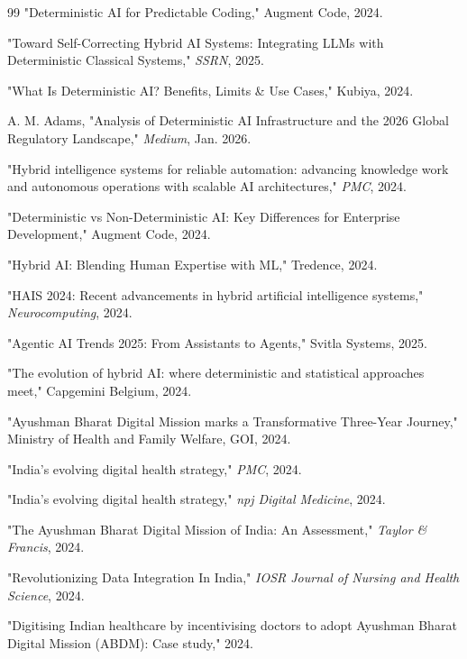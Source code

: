 \documentclass[conference]{IEEEtran}
\begin{document}
\begin{thebibliography}{99}
"Deterministic AI for Predictable Coding," Augment Code, 2024.

"Toward Self-Correcting Hybrid AI Systems: Integrating LLMs with Deterministic Classical Systems," \textit{SSRN}, 2025.

"What Is Deterministic AI? Benefits, Limits \& Use Cases," Kubiya, 2024.

A. M. Adams, "Analysis of Deterministic AI Infrastructure and the 2026 Global Regulatory Landscape," \textit{Medium}, Jan. 2026.

"Hybrid intelligence systems for reliable automation: advancing knowledge work and autonomous operations with scalable AI architectures," \textit{PMC}, 2024.

"Deterministic vs Non-Deterministic AI: Key Differences for Enterprise Development," Augment Code, 2024.

"Hybrid AI: Blending Human Expertise with ML," Tredence, 2024.

"HAIS 2024: Recent advancements in hybrid artificial intelligence systems," \textit{Neurocomputing}, 2024.

"Agentic AI Trends 2025: From Assistants to Agents," Svitla Systems, 2025.

"The evolution of hybrid AI: where deterministic and statistical approaches meet," Capgemini Belgium, 2024.

"Ayushman Bharat Digital Mission marks a Transformative Three-Year Journey," Ministry of Health and Family Welfare, GOI, 2024.

"India's evolving digital health strategy," \textit{PMC}, 2024.

"India's evolving digital health strategy," \textit{npj Digital Medicine}, 2024.

"The Ayushman Bharat Digital Mission of India: An Assessment," \textit{Taylor \& Francis}, 2024.

"Revolutionizing Data Integration In India," \textit{IOSR Journal of Nursing and Health Science}, 2024.

"Digitising Indian healthcare by incentivising doctors to adopt Ayushman Bharat Digital Mission (ABDM): Case study," 2024.


\end{thebibliography}
\end{document}
